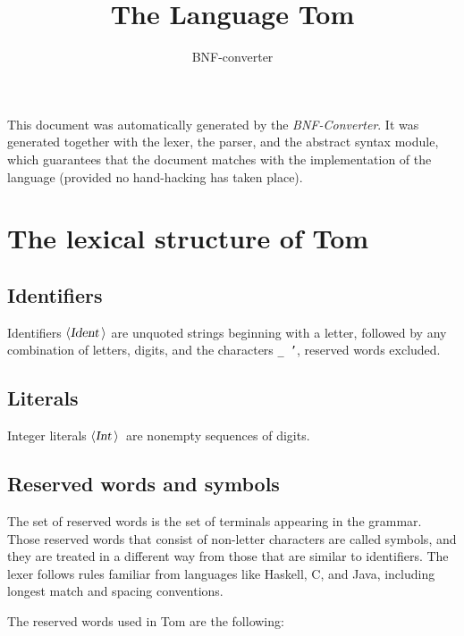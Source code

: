 \documentclass[a4paper,11pt]{article}
\author{BNF-converter}
\title{The Language Tom}
\begin{document}
\maketitle

\newcommand{\emptyP}{\mbox{$\epsilon$}}
\newcommand{\terminal}[1]{\mbox{{\texttt {#1}}}}
\newcommand{\nonterminal}[1]{\mbox{$\langle \mbox{{\sl #1 }} \! \rangle$}}
\newcommand{\arrow}{\mbox{::=}}
\newcommand{\delimit}{\mbox{$|$}}
\newcommand{\reserved}[1]{\mbox{{\texttt {#1}}}}
\newcommand{\literal}[1]{\mbox{{\texttt {#1}}}}
\newcommand{\symb}[1]{\mbox{{\texttt {#1}}}}

This document was automatically generated by the {\em BNF-Converter}. It was generated together with the lexer, the parser, and the abstract syntax module, which guarantees that the document matches with the implementation of the language (provided no hand-hacking has taken place).

\section*{The lexical structure of Tom}
\subsection*{Identifiers}
Identifiers \nonterminal{Ident} are unquoted strings beginning with a letter,
followed by any combination of letters, digits, and the characters {\tt \_ '},
reserved words excluded.


\subsection*{Literals}
Integer literals \nonterminal{Int}\ are nonempty sequences of digits.




\subsection*{Reserved words and symbols}
The set of reserved words is the set of terminals appearing in the grammar. Those reserved words that consist of non-letter characters are called symbols, and they are treated in a different way from those that are similar to identifiers. The lexer follows rules familiar from languages like Haskell, C, and Java, including longest match and spacing conventions.

The reserved words used in Tom are the following: \\
\end{document}

